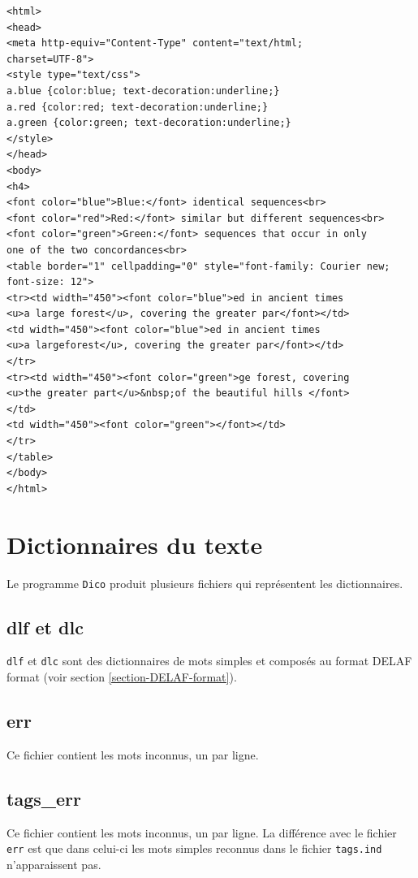 \begin{verbatim}
<html>
<head>
<meta http-equiv="Content-Type" content="text/html;
charset=UTF-8">
<style type="text/css">
a.blue {color:blue; text-decoration:underline;}
a.red {color:red; text-decoration:underline;}
a.green {color:green; text-decoration:underline;}
</style>
</head>
<body>
<h4>
<font color="blue">Blue:</font> identical sequences<br>
<font color="red">Red:</font> similar but different sequences<br>
<font color="green">Green:</font> sequences that occur in only
one of the two concordances<br>
<table border="1" cellpadding="0" style="font-family: Courier new;
font-size: 12">
<tr><td width="450"><font color="blue">ed in ancient times
<u>a large forest</u>, covering the greater par</font></td>
<td width="450"><font color="blue">ed in ancient times
<u>a largeforest</u>, covering the greater par</font></td>
</tr>
<tr><td width="450"><font color="green">ge forest, covering
<u>the greater part</u>&nbsp;of the beautiful hills </font>
</td>
<td width="450"><font color="green"></font></td>
</tr>
</table>
</body>
</html>
\end{verbatim}


\section{Dictionnaires du texte}
Le programme \verb+Dico+ produit plusieurs fichiers qui représentent les dictionnaires.

\subsection{dlf et dlc}

\verb+dlf+ et \verb+dlc+ sont des dictionnaires de mots simples et composés au format DELAF
format (voir section \ref{section-DELAF-format}).

\subsection{err}
Ce fichier contient les mots inconnus, un par ligne.

\subsection{tags\_err}
Ce fichier contient les mots inconnus, un par ligne. La différence avec le fichier \verb+err+ est que dans celui-ci les mots simples reconnus dans le fichier \verb+tags.ind+ n'apparaissent pas.

